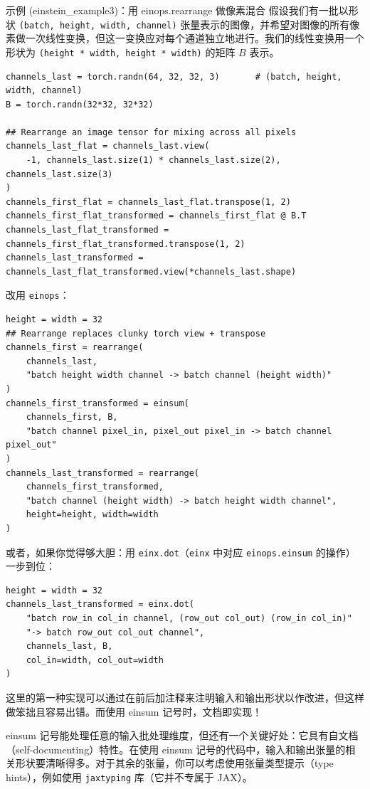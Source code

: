 \begin{tipbox}{示例 (einstein\_example3)：用 einops.rearrange 做像素混合}
假设我们有一批以形状 \texttt{(batch, height, width, channel)} 张量表示的图像，并希望对图像的所有像素做一次线性变换，但这一变换应对每个通道独立地进行。我们的线性变换用一个形状为 \texttt{(height * width, height * width)} 的矩阵 $B$ 表示。
\begin{lstlisting}
channels_last = torch.randn(64, 32, 32, 3)       # (batch, height, width, channel)
B = torch.randn(32*32, 32*32)

## Rearrange an image tensor for mixing across all pixels
channels_last_flat = channels_last.view(
    -1, channels_last.size(1) * channels_last.size(2), channels_last.size(3)
)
channels_first_flat = channels_last_flat.transpose(1, 2)
channels_first_flat_transformed = channels_first_flat @ B.T
channels_last_flat_transformed = channels_first_flat_transformed.transpose(1, 2)
channels_last_transformed = channels_last_flat_transformed.view(*channels_last.shape)
\end{lstlisting}

改用 \texttt{einops}：
\begin{lstlisting}
height = width = 32
## Rearrange replaces clunky torch view + transpose
channels_first = rearrange(
    channels_last,
    "batch height width channel -> batch channel (height width)"
)
channels_first_transformed = einsum(
    channels_first, B,
    "batch channel pixel_in, pixel_out pixel_in -> batch channel pixel_out"
)
channels_last_transformed = rearrange(
    channels_first_transformed,
    "batch channel (height width) -> batch height width channel",
    height=height, width=width
)
\end{lstlisting}

或者，如果你觉得够大胆：用 \texttt{einx.dot}（\texttt{einx} 中对应 \texttt{einops.einsum} 的操作）一步到位：
\begin{lstlisting}
height = width = 32
channels_last_transformed = einx.dot(
    "batch row_in col_in channel, (row_out col_out) (row_in col_in)"
    "-> batch row_out col_out channel",
    channels_last, B,
    col_in=width, col_out=width
)
\end{lstlisting}

这里的第一种实现可以通过在前后加注释来注明输入和输出形状以作改进，但这样做笨拙且容易出错。而使用 einsum 记号时，文档即实现！
\end{tipbox}

einsum 记号能处理任意的输入批处理维度，但还有一个关键好处：它具有自文档（self-documenting）特性。在使用 einsum 记号的代码中，输入和输出张量的相关形状要清晰得多。对于其余的张量，你可以考虑使用张量类型提示（type hints），例如使用 \texttt{jaxtyping} 库（它并不专属于 JAX）。

